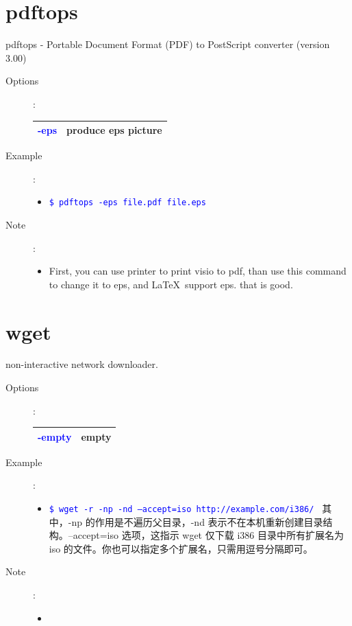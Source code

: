 \documentclass[a4paper,12pt,twoside]{book}
\newcommand{\linuxcommand}[1]{\texttt{\textcolor{blue}{\$ #1 \Pisymbol{psy}{191}}}}
\newcommand{\op}[1]{\textcolor{blue}{-#1}}
\begin{document}
\begin{CJK*}{UTF8}{song}
\section{pdftops}
	pdftops - Portable Document Format (PDF) to PostScript converter (version 3.00)
	\begin{description}
	\item[Options]:\\
		\begin{tabular}{c|p{}}
		\hline
		\op{eps} & produce eps picture\\
		\hline
		\end{tabular}
	\item[Example]:
		\begin{itemize}
		\item \linuxcommand{pdftops -eps file.pdf file.eps}
		\end{itemize}
	\item[Note]:
		\begin{itemize}
		\item First, you can use printer to print visio to pdf, than use this command to change
		it to eps, and \LaTeX\ support eps. that is good.
		\end{itemize}
	\end{description}
\section{wget}
	non-interactive network downloader.
	\begin{description}
	\item[Options]:\\
		\begin{tabular}{c|p{}}
		\hline
		\op{empty} & empty \\
		\hline
		\end{tabular}
	\item[Example]:
		\begin{itemize}
		\item \linuxcommand{wget -r -np -nd --accept=iso http://example.com/i386/} 其中，-np 的作用是不遍历父目录，-nd 表示不在本机重新创建目录结构。--accept=iso 选项，这指示 wget 仅下载 i386 目录中所有扩展名为 iso 的文件。你也可以指定多个扩展名，只需用逗号分隔即可。
		\end{itemize}
	\item[Note]:
		\begin{itemize}
		\item
		\end{itemize}
	\end{description}

\end{CJK*}
\end{document}
